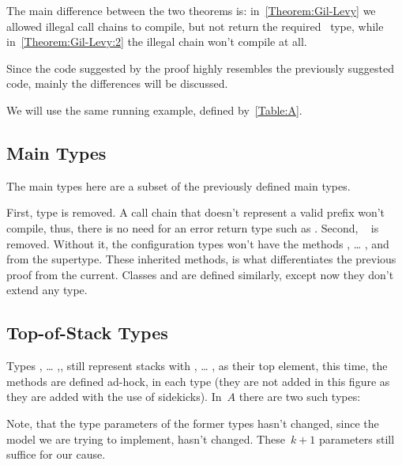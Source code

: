 \documentclass[a4paper,USenglish]{lipics-v2016}
\begin{document}
The main difference between the two theorems is:
  in~\cref{Theorem:Gil-Levy} we allowed illegal call chains to compile,
  but not return the required~ type, while in~\cref{Theorem:Gil-Levy:2}
  the illegal chain won't compile at all.

Since the code suggested by the proof highly resembles the previously
  suggested code, mainly the differences will be discussed.

We will use the same running example, defined by~\cref{Table:A}.

\subsection{Main Types}
The main types here are a subset of the previously defined main types.

\begin{quote}
\end{quote}

First, type  is removed.
A call chain that doesn't represent a valid prefix won't compile,
  thus, there is no need for an error return type such as .
Second, ~ is removed.
Without it, the configuration types won't have the
  methods , … , and \cc{\$()} from the supertype.
These inherited methods, is what differentiates the previous proof from the current.
Classes  and  are defined similarly, except now they don't extend any type.

\subsection{Top-of-Stack Types}
Types , … ,, still represent stacks
  with , … , as their top element,
  this time, the methods are defined ad-hock, in each type
  (they are not added in this figure as they are added with the use of sidekicks).
In~$A$ there are two such types:

\begin{quote}
\end{quote}


Note, that the type parameters of the former types hasn't changed,
  since the model we are trying to implement, hasn't changed.
  These~$k+1$ parameters still suffice for our cause.
\end{document}
